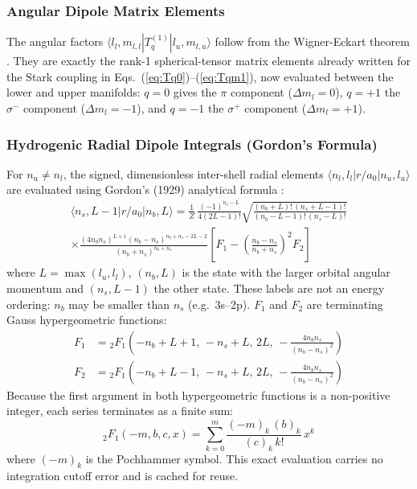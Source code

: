 \documentclass[11pt,a4paper]{article}
\numberwithin{equation}{section}
\begin{document}
\subsubsection{Angular Dipole Matrix Elements}
The angular factors $\langle l_l, m_{l,l} | T_q^{(1)} | l_u, m_{l,u} \rangle$ follow from the Wigner-Eckart theorem \cite{edmonds}. They are exactly the rank-1 spherical-tensor matrix elements already written for the Stark coupling in Eqs.~(\ref{eq:Tq0})--(\ref{eq:Tqm1}), now evaluated between the lower and upper manifolds: $q=0$ gives the $\pi$ component ($\Delta m_l = 0$), $q=+1$ the $\sigma^-$ component ($\Delta m_l = -1$), and $q=-1$ the $\sigma^+$ component ($\Delta m_l = +1$).

\subsubsection{Hydrogenic Radial Dipole Integrals (Gordon's Formula)}
For $n_u \neq n_l$, the signed, dimensionless inter-shell radial elements $\langle n_l, l_l | r/a_0 | n_u, l_u \rangle$ are evaluated using Gordon's (1929) analytical formula \cite{gordon}:
\begin{multline}
\langle n_s,L-1|r/a_0|n_b,L\rangle
= \frac{1}{Z}\,\frac{(-1)^{n_s - L}}{4(2L-1)!}
  \sqrt{\frac{(n_b+L)!\,(n_s+L-1)!}{(n_b-L-1)!\,(n_s-L)!}} \\
  \times\frac{(4 n_b n_s)^{L+1}(n_b-n_s)^{n_b+n_s-2L-2}}{(n_b+n_s)^{n_b+n_s}}
  \left[F_1 - \left(\frac{n_b-n_s}{n_b+n_s}\right)^{\!2} F_2\right]
\end{multline}
where $L = \max(l_u, l_l)$, $(n_b,L)$ is the state with the larger orbital angular momentum and $(n_s,L-1)$ the other state. These labels are not an energy ordering: $n_b$ may be smaller than $n_s$ (e.g.\ 3s--2p). $F_1$ and $F_2$ are terminating Gauss hypergeometric functions:
\begin{align}
F_1 &= {}_2F_1\!\left(-n_b+L+1,\,-n_s+L,\,2L,\,-\frac{4 n_b n_s}{(n_b-n_s)^2}\right) \\
F_2 &= {}_2F_1\!\left(-n_b+L-1,\,-n_s+L,\,2L,\,-\frac{4 n_b n_s}{(n_b-n_s)^2}\right)
\end{align}
Because the first argument in both hypergeometric functions is a non-positive integer, each series terminates as a finite sum:
\begin{equation}
{}_2F_1(-m, b, c, x) = \sum_{k=0}^{m} \frac{(-m)_k\,(b)_k}{(c)_k\,k!}\,x^k
\end{equation}
where $(-m)_k$ is the Pochhammer symbol. This exact evaluation carries no integration cutoff error and is cached for reuse.
\end{document}
